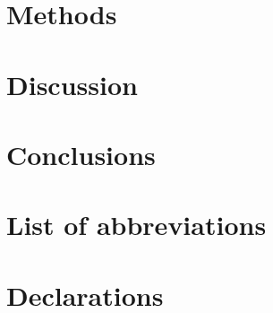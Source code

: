 


\begin{jcgroup}

\end{jcgroup}

\section{Methods}
\begin{jcgroup}




\end{jcgroup}


\begin{jcgroup}



\end{jcgroup}

\section{Discussion}
\begin{jcgroup}

\end{jcgroup}

\section{Conclusions}


\section*{List of abbreviations}


\section*{Declarations}





\appendix



